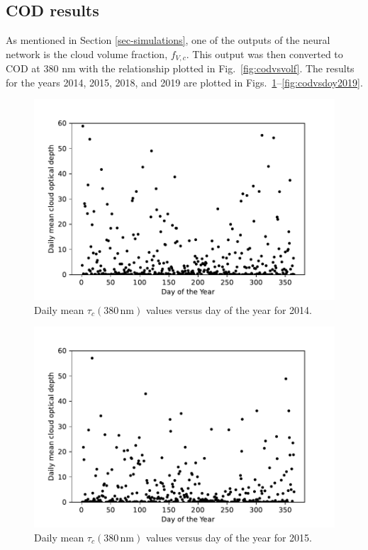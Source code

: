 \documentclass{optica-article}
\begin{document}
\subsection{COD results}
\label{sec-codresults}

As mentioned in Section \ref{sec-simulations}, one of the outputs of the neural network is the cloud volume fraction, $f_{V,c}$.  This output was then converted to COD at 380 nm with the relationship plotted in Fig.~\ref{fig:codvsvolf}. 
The results for the years 2014, 2015, 2018, and 2019 are plotted in Figs.~\ref{fig:codvsdoy2014}--\ref{fig:codvsdoy2019}.

\begin{figure}[H]
	\centering
	\includegraphics[width=0.7\linewidth]{COD_vs_DOY_2014}
	\caption{Daily mean $\tau_c{\scriptstyle(380 \, \text{nm})}$ values versus day of the year for 2014. }
	\label{fig:codvsdoy2014}
\end{figure}

\begin{figure}[H]
	\centering
	\includegraphics[width=0.7\linewidth]{COD_vs_DOY_2015}
	\caption{Daily mean $\tau_c{\scriptstyle(380 \, \text{nm})}$ values versus day of the year for 2015.}
	\label{fig:codvsdoy2015}
\end{figure}
\end{document}

